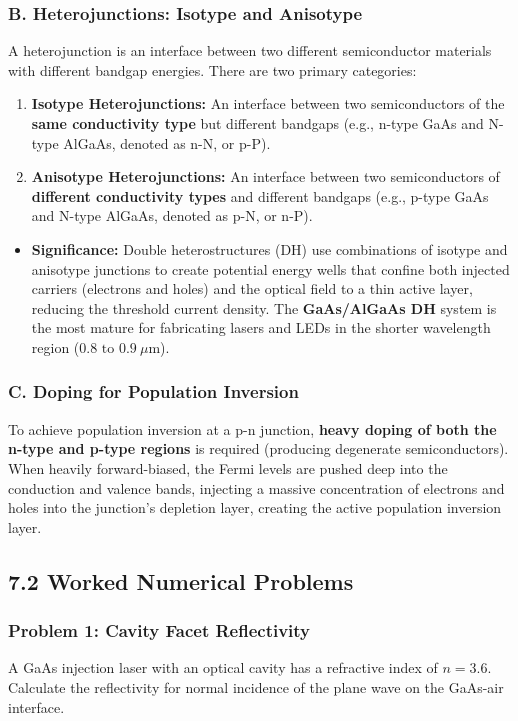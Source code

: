 \subsubsection{B. Heterojunctions: Isotype and Anisotype}
A heterojunction is an interface between two different semiconductor materials with different bandgap energies. There are two primary categories:
\begin{enumerate}
  \item \textbf{Isotype Heterojunctions:} An interface between two semiconductors of the \textbf{same conductivity type} but different bandgaps (e.g., n-type GaAs and N-type AlGaAs, denoted as n-N, or p-P).
  \item \textbf{Anisotype Heterojunctions:} An interface between two semiconductors of \textbf{different conductivity types} and different bandgaps (e.g., p-type GaAs and N-type AlGaAs, denoted as p-N, or n-P).
\end{enumerate}
\begin{itemize}
  \item   \textbf{Significance:} Double heterostructures (DH) use combinations of isotype and anisotype junctions to create potential energy wells that confine both injected carriers (electrons and holes) and the optical field to a thin active layer, reducing the threshold current density. The \textbf{GaAs/AlGaAs DH} system is the most mature for fabricating lasers and LEDs in the shorter wavelength region ($0.8 \text{ to } 0.9\ \mu\text{m}$).
\end{itemize}

\subsubsection{C. Doping for Population Inversion}
To achieve population inversion at a p-n junction, \textbf{heavy doping of both the n-type and p-type regions} is required (producing degenerate semiconductors). When heavily forward-biased, the Fermi levels are pushed deep into the conduction and valence bands, injecting a massive concentration of electrons and holes into the junction's depletion layer, creating the active population inversion layer.


\subsection{7.2 Worked Numerical Problems}

\subsubsection{Problem 1: Cavity Facet Reflectivity}
A GaAs injection laser with an optical cavity has a refractive index of $n = 3.6$. Calculate the reflectivity for normal incidence of the plane wave on the GaAs-air interface.

